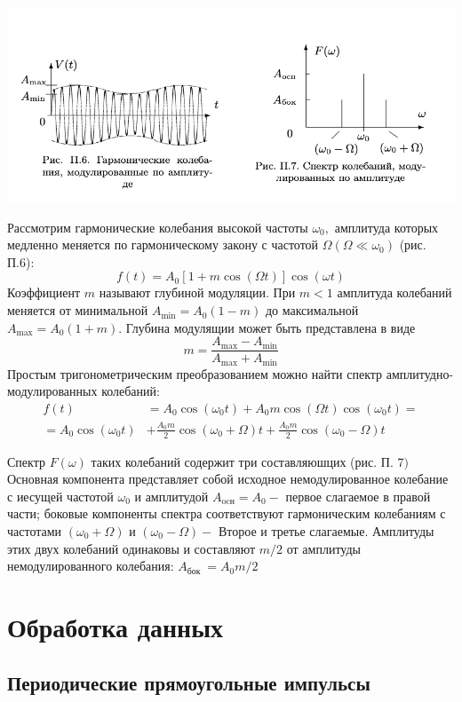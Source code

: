 \documentclass[a4paper, 12pt]{article}%
\begin{document}
\begin{center}
\includegraphics[width=0.7\linewidth]{./anat/4.jpg}\\
\end{center}
 Рассмотрим гармонические колебания высокой частоты $\omega_{0},$ амплитуда которых медленно меняется по гармоническому закону с частотой $\Omega\left(\Omega \ll \omega_{0}\right)$ (рис. П.6):
$$
f(t)=A_{0}[1+m \cos (\Omega t)] \cos (\omega t)
$$
Коэффициент $m$ называют глубиной модуляции. При $m<1$ амплитуда колебаний меняется от минимальной $A_{\min }=A_{0}(1-m)$ до максимальной $A_{\max }=A_{0}(1+m) .$ Глубина модулящии может быть представлена в виде
$$
m=\frac{A_{\max }-A_{\min }}{A_{\max }+A_{\min }}
$$
Простым тригонометрическим преобразованием можно найти спектр амплитудно-модулированных колебаний:
$$
\begin{aligned}
f(t) &=A_{0} \cos \left(\omega_{0} t\right)+A_{0} m \cos (\Omega t) \cos \left(\omega_{0} t\right)=\\
=A_{0} \cos \left(\omega_{0} t\right) &+\frac{A_{0} m}{2} \cos \left(\omega_{0}+\Omega\right) t+\frac{A_{0} m}{2} \cos \left(\omega_{0}-\Omega\right) t
\end{aligned}
$$

Спектр $F(\omega)$ таких колебаний содержит три составляюшцих (рис. П. 7$)$ Основная компонента представляет собой исходное немодулированное колебание с иесущей частотой $\omega_{0}$ и амплитудой $A_{\mathrm{ocн}}=A_{0}-$ первое слагаемое в правой части; боковые компоненты спектра соответствуют гармоническим колебаниям с частотами $\left(\omega_{0}+\Omega\right)$ и $\left(\omega_{0}-\Omega\right)-$ Второе и третье слагаемые. Амплитуды этих двух колебаний одинаковы и составляют $m / 2$ от амплитуды немодулированного колебания: $A_{\text {бок }}=A_{0} m / 2$


\section{Обработка данных}

\subsection{Периодические прямоугольные импульсы}
\end{document}
